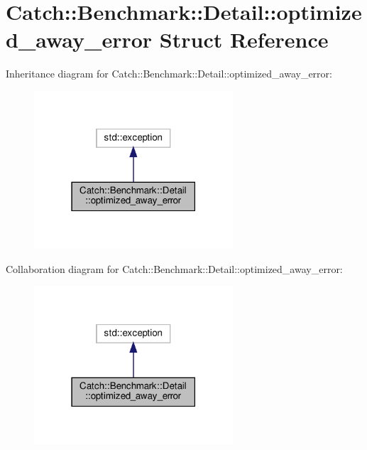 \hypertarget{structCatch_1_1Benchmark_1_1Detail_1_1optimized__away__error}{}\section{Catch\+:\+:Benchmark\+:\+:Detail\+:\+:optimized\+\_\+away\+\_\+error Struct Reference}
\label{structCatch_1_1Benchmark_1_1Detail_1_1optimized__away__error}


Inheritance diagram for Catch\+:\+:Benchmark\+:\+:Detail\+:\+:optimized\+\_\+away\+\_\+error\+:
\nopagebreak
\begin{figure}[H]
\begin{center}
\leavevmode
\includegraphics[width=210pt]{structCatch_1_1Benchmark_1_1Detail_1_1optimized__away__error__inherit__graph}
\end{center}
\end{figure}


Collaboration diagram for Catch\+:\+:Benchmark\+:\+:Detail\+:\+:optimized\+\_\+away\+\_\+error\+:
\nopagebreak
\begin{figure}[H]
\begin{center}
\leavevmode
\includegraphics[width=210pt]{structCatch_1_1Benchmark_1_1Detail_1_1optimized__away__error__coll__graph}
\end{center}
\end{figure}
